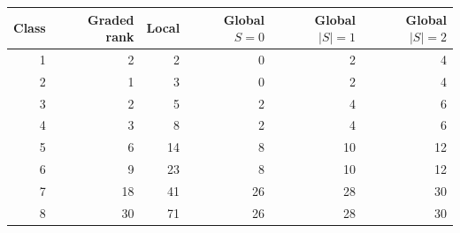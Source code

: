 \begin{center}\begin{tabular}{r|rrrrr}
\toprule Class&Graded rank&Local&Global $S=0$&Global $|S|=1$&Global $|S|=2$\\\midrule
1 & 2 & 2 & 0 & 2 & 4\\
2 & 1 & 3 & 0 & 2 & 4\\
3 & 2 & 5 & 2 & 4 & 6\\
4 & 3 & 8 & 2 & 4 & 6\\
5 & 6 & 14 & 8 & 10 & 12\\
6 & 9 & 23 & 8 & 10 & 12\\
7 & 18 & 41 & 26 & 28 & 30\\
8 & 30 & 71 & 26 & 28 & 30\\
\bottomrule\end{tabular}\end{center}